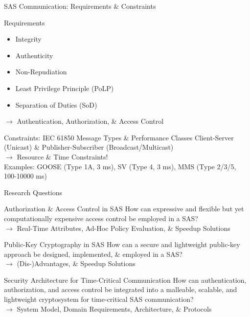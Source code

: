 \documentclass[en]{sdqbeamer}
\begin{document}
\begin{frame}{SAS Communication: Requirements \& Constraints}
    \begin{blueblock}{Requirements}
        \begin{itemize}
            \item Integrity
            \item Authenticity
            \item Non-Repudiation
            \item Least Privilege Principle (PoLP)
            \item Separation of Duties (SoD)
        \end{itemize}
        $\rightarrow$ Authentication, Authorization, \& Access Control
    \end{blueblock}
    \begin{grayblock}{Constraints: IEC 61850 Message Types \& Performance Classes \parencite*{IEC61850P5,IEC61850P8}}
        Client-Server (Unicast) \& Publisher-Subscriber (Broadcast/Multicast) \\$\rightarrow$ Resource \& Time Constraints!
        \\Examples: GOOSE (Type 1A, 3 ms), SV (Type 4, 3 ms), MMS (Type 2/3/5, 100-10000 ms)
    \end{grayblock}
\end{frame}

\begin{frame}{Research Questions}
    \begin{greenblock}{Authorization \& Access Control in SAS}
        How can expressive and flexible but yet computationally expensive access control be employed in a SAS?
        \\$\rightarrow$ Real-Time Attributes, Ad-Hoc Policy Evaluation, \& Speedup Solutions
    \end{greenblock}

    \begin{greenblock}{Public-Key Cryptography in SAS}
        How can a secure and lightweight public-key approach be designed, implemented, \& employed in a SAS?
        \\$\rightarrow$ (Dis-)Advantages, \& Speedup Solutions
    \end{greenblock}

    \begin{greenblock}{Security Architecture for Time-Critical Communication}
        How can authentication, authorization, and access control be integrated into a malleable, scalable, and lightweight cryptosystem for time-critical SAS communication?
        \\$\rightarrow$ System Model, Domain Requirements, Architecture, \& Protocols
    \end{greenblock}
\end{frame}
\end{document}
